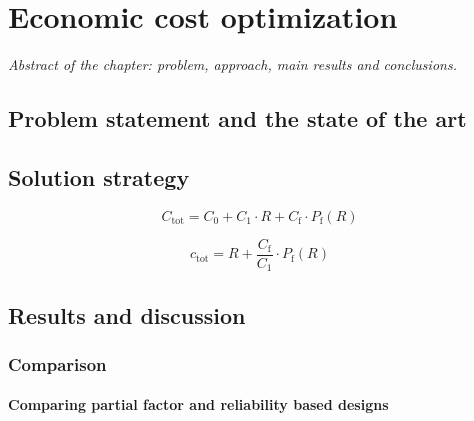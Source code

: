 \chapter{Economic cost optimization}
\label{cha:eco_cost_opti}

\ifpdf
    \graphicspath{{Chapter7/Figs/Raster/}{Chapter7/Figs/PDF/}{Chapter7/Figs/}}
\else
    \graphicspath{{Chapter7/Figs/Vector/}{Chapter7/Figs/}}
\fi

\leftskip=1cm
\noindent
\emph{Abstract of the chapter: problem, approach, main results and conclusions.}

\leftskip=0pt\rightskip=0pt

\section{Problem statement and the state of the art}

\section{Solution strategy}

\begin{equation}
 	{C_{{\mathrm{tot}}}} = {C_0} + {C_1} \cdot R + {C_{\mathrm{f}}} \cdot {P_{\mathrm{f}}}(R)
\end{equation}

\begin{equation}
 	{c_{\mathrm{tot}}} = R + \frac{{{C_{\mathrm{f}}}}}{{{C_1}}} \cdot {P_{\mathrm{f}}}(R)
\end{equation}

\section{Results and discussion}

\subsection{Comparison}

\subsubsection{Comparing partial factor and reliability based designs}


